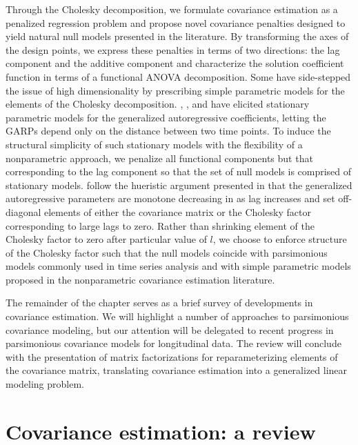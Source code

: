 \documentclass[12pt]{article}
\theoremstyle{definition}
\begin{document}
Through the Cholesky decomposition, we formulate covariance estimation as a penalized regression problem and propose novel covariance penalties designed to yield natural null models presented in the literature. By transforming the axes of the design points, we express these penalties in terms of two directions: the lag component and the additive component and characterize the solution coefficient function in terms of a functional ANOVA decomposition. Some have side-stepped the issue of high dimensionality by prescribing simple parametric models for the elements of the Cholesky decomposition.  \citet{chen2011efficient}, \citet{pourahmadi1999joint}, and \citet{pourahmadi2002dynamic} have elicited stationary parametric models for the generalized autoregressive coefficients, letting the GARPs depend only on the distance between two time points. To induce the structural simplicity of such stationary models with the flexibility of a nonparametric approach, we penalize all functional components but that corresponding to the lag component so that the set of null models is comprised of stationary models.  \citet{huang2007estimation} follow the hueristic argument presented in \citet{pourahmadi1999joint} that the generalized autoregressive parameters are monotone decreasing in as lag increases and set off-diagonal elements of either the covariance matrix or the Cholesky factor corresponding to large lags to zero. Rather than shrinking element of the Cholesky factor to zero after particular value of $l$, we choose to enforce structure of the Cholesky factor such that the null models coincide with parsimonious models commonly used in time series analysis and with simple parametric models proposed in the nonparametric covariance estimation literature.

\bigskip

The remainder of the chapter serves as a brief survey of developments in covariance estimation.  We will highlight a number of approaches to parsimonious covariance modeling, but our attention will be delegated to recent progress in parsimonious covariance models for longitudinal data. The review will conclude with the presentation of matrix factorizations for reparameterizing elements of the covariance matrix, translating covariance estimation into a generalized linear modeling problem.	

\section{Covariance estimation: a review}
\end{document}
